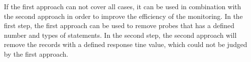 If the first approach can not cover all cases, it can be used in combination with the second approach in order to improve the efficiency of the monitoring. In the first step, the first approach can be used to remove probes that has a defined number and types of statements. In the second step, the second approach will remove the records with a defined response tine value, which could not be judged by the first approach.\\


 
